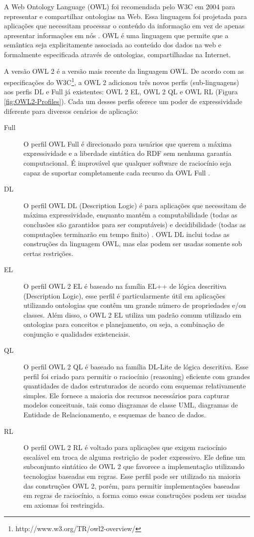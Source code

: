 A \foreignlanguage{english}{Web Ontology Language} (OWL) foi recomendada
pelo W3C em 2004 para representar e compartilhar ontologias na Web.
Essa linguagem foi projetada para aplicações que necessitam processar
o conteúdo da informação em vez de apenas apresentar informações em
nós \citet{mcguinness2004owl}. OWL é uma linguagem que permite que
a semântica seja explicitamente associada ao conteúdo dos dados na
web e formalmente especificada através de ontologias, compartilhadas
na Internet. 

A versão OWL 2 é a versão mais recente da linguagem OWL. De acordo
com as especificações do W3C\footnote{http://www.w3.org/TR/owl2-overview/},
a OWL 2 adicionou três novos perfis (sub-linguagens) aos perfis DL
e Full já existentes: OWL 2 EL, OWL 2 QL e OWL RL (Figura \ref{fig:OWL2-Profiles}).
Cada um desses perfis oferece um poder de expressividade diferente
para diversos cenários de aplicação:
\begin{description}
\item [{Full}] O perfil OWL Full é direcionado para usuários que querem
a máxima expressividade e a liberdade sintática do RDF sem nenhuma
garantia computacional. É improvável que qualquer software de raciocínio
seja capaz de suportar completamente cada recurso da OWL Full \citep{mcguinness2004owl}.
\item [{DL}] O perfil OWL DL (\foreignlanguage{english}{Description Logic})
é para aplicações que necessitam de máxima expressividade, enquanto
mantém a computabilidade (todas as conclusões são garantidos para
ser computáveis) e decidibilidade (todas as computações terminarão
em tempo finito) \citep{mcguinness2004owl}. OWL DL inclui todas as
construções da linguagem OWL, mas elas podem ser usadas somente sob
certas restrições. 
\item [{EL}] O perfil OWL 2 EL é baseado na família EL++ de lógica descritiva
(\foreignlanguage{english}{Description} \foreignlanguage{english}{Logic}),
esse perfil é particularmente útil em aplicações utilizando ontologias
que contêm um grande número de propriedades e/ou classes. Além disso,
o OWL 2 EL utiliza um padrão comum utilizado em ontologias para conceitos
e planejamento, ou seja, a combinação de conjunção e qualidades existenciais.
\item [{QL}] O perfil OWL 2 QL é baseado na família DL-Lite de lógica descritiva.
Esse perfil foi criado para permitir o raciocínio (\foreignlanguage{english}{reasoning})
eficiente com grandes quantidades de dados estruturados de acordo
com esquemas relativamente simples. Ele fornece a maioria dos recursos
necessários para capturar modelos conceituais, tais como diagramas
de classe UML, diagramas de Entidade de Relacionamento, e esquemas
de banco de dados. 
\item [{RL}] O perfil OWL 2 RL é voltado para aplicações que exigem raciocínio
escalável em troca de alguma restrição de poder expressivo. Ele define
um subconjunto sintático de OWL 2 que favorece a implementação utilizando
tecnologias baseadas em regras. Esse perfil pode ser utilizado na
maioria das construções OWL 2, porém, para permitir implementações
baseadas em regras de raciocínio, a forma como essas construções podem
ser usadas em axiomas foi restringida. 
\end{description}
